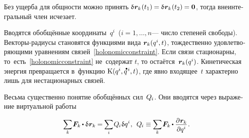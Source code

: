 \begin{otherlanguage}{russian}
\vspace{-0.16em}\noindent
Без ущерба для общности можно принять ${\variation{\hspace{.1ex}\locationvector_k}\hspace{.1ex}(t_1) \hspace{-0.1ex} = \variation{\hspace{.1ex}\locationvector_k}\hspace{.1ex}(t_2) \hspace{-0.1ex} = \bm{0}}$, тогда внеинтегральный член исчезает.

Вводятся обобщённые координаты~$q^i$~(${i = 1, \ldots, n}$\:--- число степеней свободы).
Векторы-радиусы становятся функциями \hbox{вида} ${\bm{r}_{k}(q^i, t)}$, тождественно удовлетворяющими уравнениям связей~\eqref{holonomicconstraint}.
Если связи стационарны, то~есть~\eqref{holonomicconstraint} не~содержат $t$, то остаётся~${\bm{r}_{k}(q^i)}$.
Кинетическая энергия превращается в~функцию ${\kineticenergydensity \hspace{.1ex} (q^i, \mathdotabove{q}^{\hspace{.2ex}i}, t)}$, где явно входящее~$t$ характерно лишь для нестационарных связей.

Весьма существенно понятие обобщённых сил~${Q_{\hspace{-0.1ex}i}}$.
Они вводятся через выражение виртуальной работы

\nopagebreak\vspace{-0.25em}\begin{equation}
\scalebox{0.92}[0.96]{$ \displaystyle \sum_{\smash{k}} $} \hspace{.16ex}
\bm{F}_k \hspace{-0.1ex} \dotp \variation{\hspace{.1ex}\locationvector_k} \hspace{-0.1ex}
= \hspace{-0.1ex} \scalebox{0.92}[0.96]{$\displaystyle \sum_{i}$} \hspace{.16ex} Q_{\hspace{-0.1ex}i} \hspace{.12ex} \variation{q^i} \hspace{.1ex} ,
\:\:
Q_{\hspace{-0.1ex}i} \equiv
\scalebox{0.92}[0.96]{$ \displaystyle \sum_{\smash{k}} $} \hspace{.16ex}
\bm{F}_k \hspace{-0.1ex} \dotp \scalebox{0.96}{$ \displaystyle \frac{\raisemath{-0.12em}{\partial \hspace{.1ex} \locationvector_k}}{\raisemath{-0.1em}{\partial q^i}} $} \hspace{.16ex} .
\vspace{-0.1em}\end{equation}


\end{otherlanguage}
